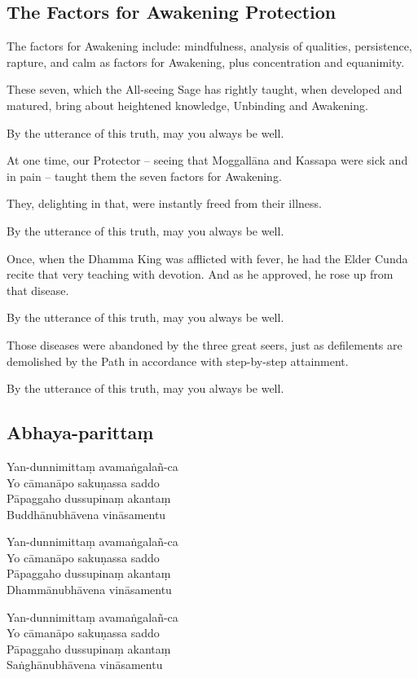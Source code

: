 

\subsection{The Factors for Awakening Protection}


The factors for Awakening include: mindfulness, analysis of qualities,
persistence, rapture, and calm as factors for Awakening, plus concentration and
equanimity.

These seven, which the All-seeing Sage has rightly taught, when developed and
matured, bring about heightened knowledge, Unbinding and Awakening.

By the utterance of this truth, may you always be well.

At one time, our Protector -- seeing that Moggallāna and Kassapa were sick and
in pain -- taught them the seven factors for Awakening.

They, delighting in that, were instantly freed from their illness.

By the utterance of this truth, may you always be well.

Once, when the Dhamma King was afflicted with fever, he had the Elder Cunda
recite that very teaching with devotion. And as he approved, he rose up from
that disease.

By the utterance of this truth, may you always be well.

Those diseases were abandoned by the three great seers, just as defilements are
demolished by the Path in accordance with step-by-step attainment.

By the utterance of this truth, may you always be well.

\subsection{Abhaya-parittaṃ}
\label{yan-dunnimittam}


\begin{paritta}
Yan-dunnimittaṃ avamaṅgalañ-ca\\
Yo cāmanāpo sakuṇassa saddo\\
Pāpaggaho dussupinaṃ akantaṃ\\
Buddhānubhāvena vināsamentu

Yan-dunnimittaṃ avamaṅgalañ-ca\\
Yo cāmanāpo sakuṇassa saddo\\
Pāpaggaho dussupinaṃ akantaṃ\\
Dhammānubhāvena vināsamentu

Yan-dunnimittaṃ avamaṅgalañ-ca\\
Yo cāmanāpo sakuṇassa saddo\\
Pāpaggaho dussupinaṃ akantaṃ\\
Saṅghānubhāvena vināsamentu 
\end{paritta}

